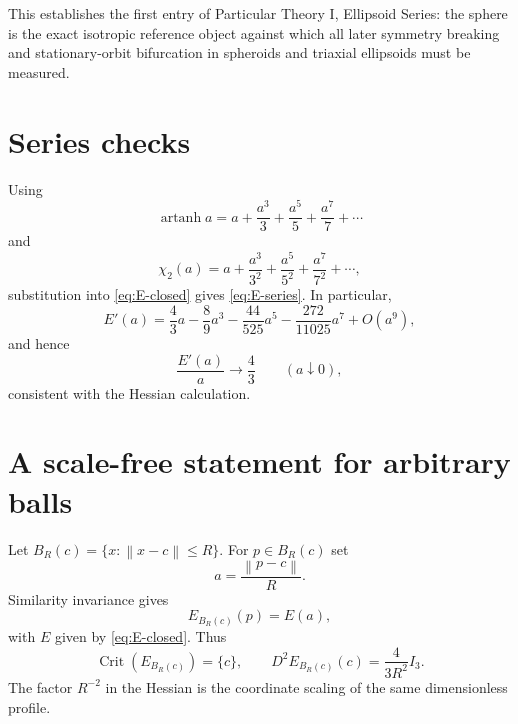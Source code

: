 \documentclass[11pt]{article}
\theoremstyle{definition}
\newcommand{\atanh}{\operatorname{artanh}}
\newcommand{\norm}[1]{\left\lVert #1\right\rVert}
\begin{document}
This establishes the first entry of Particular Theory I, Ellipsoid Series: the sphere is the exact isotropic reference object against which all later symmetry breaking and stationary-orbit bifurcation in spheroids and triaxial ellipsoids must be measured.

\appendix

\section{Series checks}

Using
\[
\atanh a
=a+\frac{a^3}{3}+\frac{a^5}{5}+\frac{a^7}{7}+\cdots
\]
and
\[
\chi_2(a)
=a+\frac{a^3}{3^2}+\frac{a^5}{5^2}+\frac{a^7}{7^2}+\cdots,
\]
substitution into \eqref{eq:E-closed} gives \eqref{eq:E-series}.  In particular,
\[
E'(a)
=
\frac43a
-
\frac89a^3
-
\frac{44}{525}a^5
-
\frac{272}{11025}a^7
+O(a^9),
\]
and hence
\[
\frac{E'(a)}{a}\longrightarrow\frac43
\qquad(a\downarrow0),
\]
consistent with the Hessian calculation.

\section{A scale-free statement for arbitrary balls}

Let $B_R(c)=\{x:\norm{x-c}\leq R\}$.  For $p\in B_R(c)$ set
\[
a=\frac{\norm{p-c}}{R}.
\]
Similarity invariance gives
\[
E_{B_R(c)}(p)=E(a),
\]
with $E$ given by \eqref{eq:E-closed}.  Thus
\[
\operatorname{Crit}(E_{B_R(c)})=\{c\},
\qquad
D^2E_{B_R(c)}(c)=\frac{4}{3R^2}I_3.
\]
The factor $R^{-2}$ in the Hessian is the coordinate scaling of the same dimensionless profile.
\end{document}
